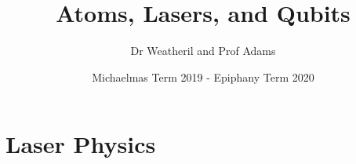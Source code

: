 \documentclass[a4paper, 11pt, normalem]{report}
\title{Atoms, Lasers, and Qubits \vspace{-20pt}}
\author{Dr Weatheril and Prof Adams}
\date{\vspace{-15pt}Michaelmas Term 2019 - Epiphany Term 2020}
\begin{document}
\maketitle
\tableofcontents

\part{Laser Physics}
\end{document}
